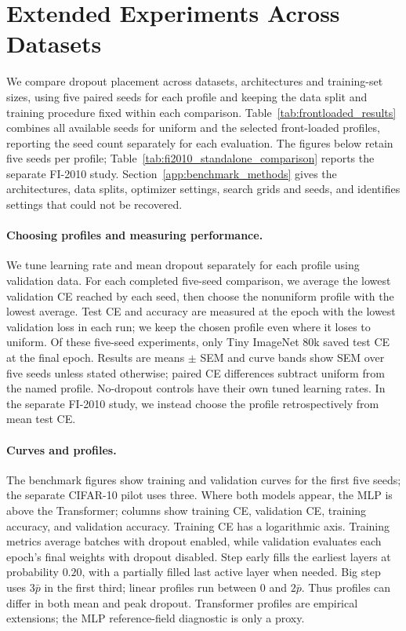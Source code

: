 \FloatBarrier
\raggedbottom
\section{Extended Experiments Across Datasets}
\label{app:extended_experiments}
We compare dropout placement across datasets, architectures and training-set sizes, using five paired seeds for each profile and keeping the data split and training procedure fixed within each comparison. Table~\ref{tab:frontloaded_results} combines all available seeds for uniform and the selected front-loaded profiles, reporting the seed count separately for each evaluation. The figures below retain five seeds per profile; Table~\ref{tab:fi2010_standalone_comparison} reports the separate FI-2010 study. Section~\ref{app:benchmark_methods} gives the architectures, data splits, optimizer settings, search grids and seeds, and identifies settings that could not be recovered.

\paragraph{Choosing profiles and measuring performance.}
We tune learning rate and mean dropout separately for each profile using validation data. For each completed five-seed comparison, we average the lowest validation CE reached by each seed, then choose the nonuniform profile with the lowest average. Test CE and accuracy are measured at the epoch with the lowest validation loss in each run; we keep the chosen profile even where it loses to uniform. Of these five-seed experiments, only Tiny ImageNet 80k saved test CE at the final epoch. Results are means $\pm$ SEM and curve bands show SEM over five seeds unless stated otherwise; paired CE differences subtract uniform from the named profile. No-dropout controls have their own tuned learning rates. In the separate FI-2010 study, we instead choose the profile retrospectively from mean test CE.

\paragraph{Curves and profiles.}
The benchmark figures show training and validation curves for the first five seeds; the separate CIFAR-10 pilot uses three. Where both models appear, the MLP is above the Transformer; columns show training CE, validation CE, training accuracy, and validation accuracy. Training CE has a logarithmic axis. Training metrics average batches with dropout enabled, while validation evaluates each epoch's final weights with dropout disabled. Step early fills the earliest layers at probability $0.20$, with a partially filled last active layer when needed. Big step uses $3\bar p$ in the first third; linear profiles run between $0$ and $2\bar p$. Thus profiles can differ in both mean and peak dropout. Transformer profiles are empirical extensions; the MLP reference-field diagnostic is only a proxy.

